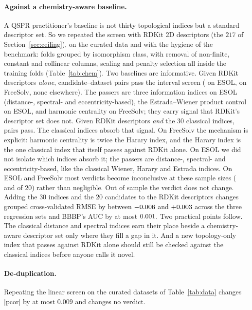 \documentclass[11pt,a4paper]{article}
\theoremstyle{definition}
\newcommand{\pcor}{\mathrm{pcor}}
\begin{document}
\paragraph{Against a chemistry-aware baseline.} A QSPR practitioner's
baseline is not thirty topological indices but a standard descriptor
set. So we repeated the screen with RDKit 2D descriptors (the $217$ of
Section~\ref{sec:ceiling}), on the curated data and with the hygiene
of the benchmark: folds grouped by isomorphism class, with removal of
non-finite, constant and collinear columns, scaling and penalty
selection all inside the training folds (Table~\ref{tab:chem}). Two
baselines are informative. Given RDKit descriptors \emph{alone},
\chemPassRdTotal{} candidate--dataset pairs pass the interval screen
(\chemPassRdEsol{} on ESOL, \chemPassRdFsv{} on FreeSolv, none
elsewhere). The passers are three information indices on ESOL
(distance-, spectral- and eccentricity-based), the Estrada--Wiener
product control on ESOL, and harmonic centrality on FreeSolv; they
carry signal that RDKit's descriptor set does not. Given RDKit
descriptors \emph{and} the $30$ classical indices, \chemPassTotal{}
pairs pass. The classical indices absorb that signal. On FreeSolv the
mechanism is explicit: harmonic centrality is twice the Harary index,
and the Harary index is the one classical index that itself passes
against RDKit alone. On ESOL we did not isolate which indices absorb
it; the passers are distance-, spectral- and eccentricity-based, like
the classical Wiener, Harary and Estrada indices. On ESOL and
FreeSolv most verdicts become inconclusive at these sample sizes
(\chemIncEsol{} and \chemIncFsv{} of $20$) rather than negligible. Out
of sample the verdict does not change. Adding the $30$ indices and the
$20$ candidates to the RDKit descriptors changes grouped
cross-validated RMSE by between $-0.006$ and
$+0.003$ across the three regression sets and BBBP's AUC by
at most $0.001$. Two practical points follow. The classical
distance and spectral indices earn their place beside a
chemistry-aware descriptor set only where they fill a gap in it. And a
new topology-only index that passes against RDKit alone should still
be checked against the classical indices before anyone calls it
novel.



\paragraph{De-duplication.} Repeating the linear screen on the curated
datasets of Table~\ref{tab:data} changes $|\pcor|$ by at most $0.009$
and changes no verdict.
\end{document}
